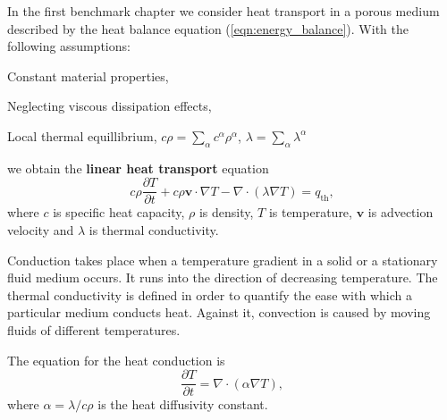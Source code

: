 

In the first benchmark chapter
we consider heat transport in a porous medium described by the heat balance equation (\ref{eqn:energy_balance}).
With the following assumptions:
\begin{compactitem}
	\item Constant material properties,
	\item Neglecting viscous dissipation effects,
	\item Local thermal equillibrium, $c\rho = \sum_\alpha c^\alpha \rho^{\alpha}$, $\lambda = \sum_\alpha \lambda^{\alpha}$
\end{compactitem}
we obtain the \textbf{linear heat transport} equation
%
\begin{equation}
c\rho\frac{\partial T}{\partial t} + c\rho \mathbf v \cdot \nabla T - \nabla\cdot(\lambda\nabla T) 
= 
q_{\mathrm{th}},
\end{equation}
%
where $c$ is specific heat capacity, $\rho$ is density, $T$ is temperature, $\mathbf v$ is advection velocity and $\lambda$ is thermal conductivity.

Conduction takes place when a temperature gradient in a solid or a stationary fluid medium occurs. It runs into the direction of decreasing temperature. The thermal conductivity is defined in order to quantify the ease with which a particular medium conducts heat. Against it, convection is caused by moving fluids of different temperatures.

The equation for the heat conduction is
%
\begin{equation}
\frac{\partial T}{\partial t} = \nabla\cdot(\alpha\nabla T),
\label{eqn:heat_conduction}
\end{equation}
where $\alpha = \lambda/c\rho$ is the heat diffusivity constant.


